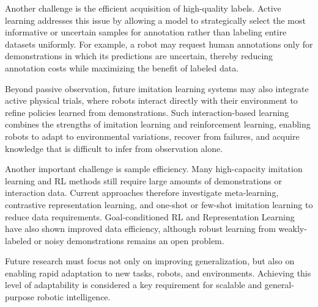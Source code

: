 Another challenge is the efficient acquisition of high-quality labels. Active learning addresses this issue by allowing a model to strategically select the most informative or uncertain samples for annotation rather than labeling entire datasets uniformly. For example, a robot may request human annotations only for demonstrations in which its predictions are uncertain, thereby reducing annotation costs while maximizing the benefit of labeled data.

Beyond passive observation, future imitation learning systems may also integrate active physical trials, where robots interact directly with their environment to refine policies learned from demonstrations. Such interaction-based learning combines the strengths of imitation learning and reinforcement learning, enabling robots to adapt to environmental variations, recover from failures, and acquire knowledge that is difficult to infer from observation alone.




Another important challenge is sample efficiency. Many high-capacity imitation learning and RL methods still require large amounts of demonstrations or interaction data. Current approaches therefore investigate meta-learning, contrastive representation learning, and one-shot or few-shot imitation learning to reduce data requirements. Goal-conditioned RL and Representation Learning have also shown improved data efficiency, although robust learning from weakly-labeled or noisy demonstrations remains an open problem.


Future research must focus not only on improving generalization, but also on enabling rapid adaptation to new tasks, robots, and environments. Achieving this level of adaptability is considered a key requirement for scalable and general-purpose robotic intelligence.






